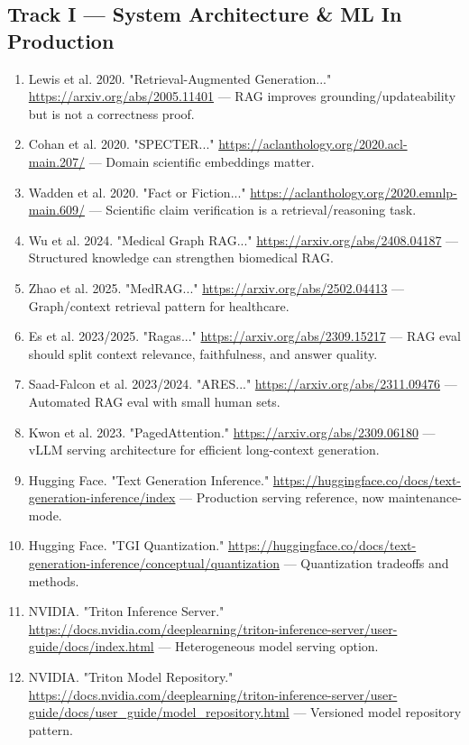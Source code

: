 \documentclass[11pt]{report}
\begin{document}
\subsection{Track I — System Architecture \& ML In Production}

\begin{enumerate}
\item Lewis et al. 2020. "Retrieval-Augmented Generation..." \url{https://arxiv.org/abs/2005.11401} — RAG improves grounding/updateability but is not a correctness proof.
\item Cohan et al. 2020. "SPECTER..." \url{https://aclanthology.org/2020.acl-main.207/} — Domain scientific embeddings matter.
\item Wadden et al. 2020. "Fact or Fiction..." \url{https://aclanthology.org/2020.emnlp-main.609/} — Scientific claim verification is a retrieval/reasoning task.
\item Wu et al. 2024. "Medical Graph RAG..." \url{https://arxiv.org/abs/2408.04187} — Structured knowledge can strengthen biomedical RAG.
\item Zhao et al. 2025. "MedRAG..." \url{https://arxiv.org/abs/2502.04413} — Graph/context retrieval pattern for healthcare.
\item Es et al. 2023/2025. "Ragas..." \url{https://arxiv.org/abs/2309.15217} — RAG eval should split context relevance, faithfulness, and answer quality.
\item Saad-Falcon et al. 2023/2024. "ARES..." \url{https://arxiv.org/abs/2311.09476} — Automated RAG eval with small human sets.
\item Kwon et al. 2023. "PagedAttention." \url{https://arxiv.org/abs/2309.06180} — vLLM serving architecture for efficient long-context generation.
\item Hugging Face. "Text Generation Inference." \url{https://huggingface.co/docs/text-generation-inference/index} — Production serving reference, now maintenance-mode.
\item Hugging Face. "TGI Quantization." \url{https://huggingface.co/docs/text-generation-inference/conceptual/quantization} — Quantization tradeoffs and methods.
\item NVIDIA. "Triton Inference Server." \url{https://docs.nvidia.com/deeplearning/triton-inference-server/user-guide/docs/index.html} — Heterogeneous model serving option.
\item NVIDIA. "Triton Model Repository." \url{https://docs.nvidia.com/deeplearning/triton-inference-server/user-guide/docs/user_guide/model_repository.html} — Versioned model repository pattern.

\end{enumerate}
\end{document}
